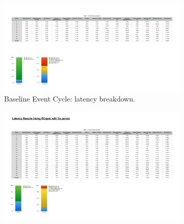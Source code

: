 \begin{figure}[ht!]
  \centering
  \begin{subfigure}{.5\textwidth}
    \centering
    \includegraphics[height=\linewidth]{./images/cloud_ecspec_breakdown}
    \caption{Baseline Event Cycle: latency breakdown.}
    \label{fig:ecspecf_base}
    \end{subfigure}%
    \begin{subfigure}{.5\textwidth}
      \centering
      \includegraphics[height=\linewidth]{./images/cloud_ecspecf_breakdown}

\end{subfigure}
\end{figure}
